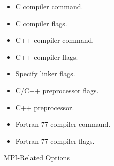 \begin{itemize}
\item {}

C compiler command.

\item {}

C compiler flags.

\item {}

C++ compiler command.

\item {}

C++ compiler flags.

\item {}

Specify linker flags.

\item {}

C/C++ preprocessor flags.

\item {}

C++ preprocessor.

\item {}

Fortran 77 compiler command.

\item {}

Fortran 77 compiler flags.
\end{itemize}

MPI-Related Options

